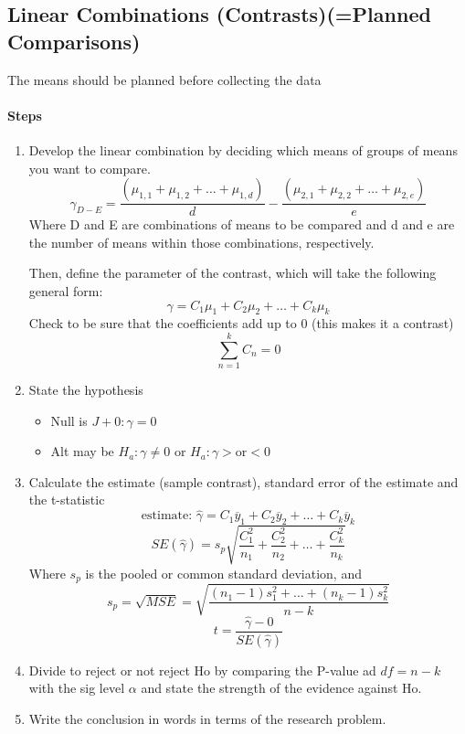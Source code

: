 \documentclass[../STAT-252-Notes.tex]{subfiles}
\begin{document}
\subsection{Linear Combinations (Contrasts)(=Planned Comparisons)}
The means should be planned before collecting the data

\paragraph{Steps}
\begin{enumerate}
  \item Develop the linear combination by deciding which means of groups of means you want to compare.
    \[ 
      \gamma_{D-E} = \frac{(\mu_{1,1} + \mu_{1,2} + \ldots + \mu_{1,d})}{d} - \frac{(\mu_{2,1} + \mu_{2,2} +  \ldots + \mu_{2,e})}{e} 
    \] 
   Where D and E are combinations of means to be compared and d and e are the number of means within those combinations, respectively.

   Then, define the parameter of the contrast, which will take the following general form:
   \[ 
   \gamma = C_1\mu_1 + C_2\mu_2 + \dots + C_k\mu_k 
   \] 
  Check to be sure that the coefficients add up to 0 (this makes it a contrast)
  \[ 
  \sum_{n=1}^{k} C_n = 0 
  \] 
  \item State the hypothesis
    \begin{itemize}
      \item Null is $J+0: \gamma = 0$ 
      \item Alt may be $ H_a: \gamma \neq 0 $ or $ H_a : \gamma > \text{or} < 0$
    \end{itemize}
  \item Calculate the estimate (sample contrast), standard error of the estimate and the t-statistic
    \[ 
      \text{estimate: } \hat{\gamma} = C_1\overline{y}_1 + C_2\overline{y}_2 + \ldots + C_k\overline{y}_k 
    \] 
    \[ 
      SE(\hat{\gamma}) = s_p \sqrt{\frac{C_1^{2}}{n_1} + \frac{C_2^{2}}{n_2}+\ldots+\frac{C_k^{2}}{n_k}}     
    \] 
    Where $s_p$ is the pooled or common standard deviation, and 
    \[ 
      s_p = \sqrt{MSE}  = \sqrt{\frac{(n_1-1)s_1^{2} + \ldots + (n_k - 1)s_k^{2}}{n-k} }
    \] 
    \[ 
      t = \frac{\hat{\gamma} - 0}{SE(\hat{\gamma})} 
    \] 
  \item Divide to reject or not reject Ho by comparing the P-value ad $df = n-k$ with the sig level $\alpha$ and state the strength of the evidence against Ho.
  \item Write the conclusion in words in terms of the research problem.
\end{enumerate}
\end{document}
